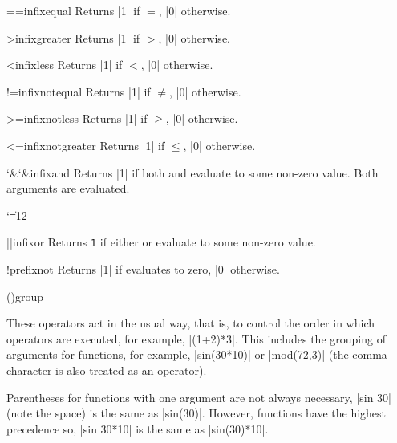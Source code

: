 \begin{math-operator}{==}{infix}{equal}
  Returns |1| if $=$, |0| otherwise.
\end{math-operator}

\begin{math-operator}{>}{infix}{greater}
  Returns |1| if $>$, |0| otherwise.
\end{math-operator}

\begin{math-operator}{<}{infix}{less}
  Returns |1| if $<$, |0| otherwise.
\end{math-operator}

\begin{math-operator}{!=}{infix}{notequal}
  Returns |1| if $\neq$, |0| otherwise.
\end{math-operator}

\begin{math-operator}{>=}{infix}{notless}
  Returns |1| if $\geq$, |0| otherwise.
\end{math-operator}

\begin{math-operator}{<=}{infix}{notgreater}
  Returns |1| if $\leq$, |0| otherwise.
\end{math-operator}

\begin{math-operator}{{\char`\&}{\char`\&}}{infix}{and}
  Returns |1| if both  and  evaluate to some
  non-zero value. Both arguments are evaluated.
\end{math-operator}



{
 \catcode`\|=12
\begin{math-operator}[no index]{||}{infix}{or}
  Returns {\tt 1} if either  or  evaluate to some
  non-zero value.
\end{math-operator}
}

\begin{math-operator}{!}{prefix}{not}
  Returns |1| if  evaluates to zero, |0| otherwise.
\end{math-operator}


\begin{math-operators}{(}{)}{group}{}

These operators act in the usual way, that is, to control the order
in which operators are executed, for example, |(1+2)*3|. This
includes the grouping of arguments for functions, for example,
|sin(30*10)| or |mod(72,3)| (the comma character is also treated
as an operator).

Parentheses for functions with one argument are not always
necessary, |sin 30| (note the space) is the same as |sin(30)|.
However, functions have the highest precedence so, |sin 30*10|
is the same as |sin(30)*10|.

\end{math-operators}



